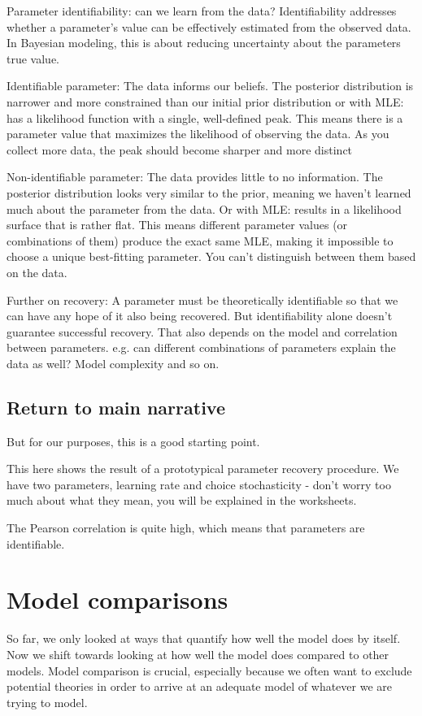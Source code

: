 \documentclass[12pt]{article}
\begin{document}
Parameter identifiability: can we learn from the data?
Identifiability addresses whether a parameter's value can be effectively estimated from the observed data. In Bayesian modeling, this is about reducing uncertainty about the parameters true value.

Identifiable parameter: The data informs our beliefs. The posterior distribution is narrower and more constrained than our initial prior distribution or with MLE: has a likelihood function with a single, well-defined peak. This means there is a parameter value that maximizes the likelihood of observing the data. As you collect more data, the peak should become sharper and more distinct

Non-identifiable parameter: The data provides little to no information. The posterior distribution looks very similar to the prior, meaning we haven't learned much about the parameter from the data. Or with MLE: results in a likelihood surface that is rather flat. This means different parameter values (or combinations of them) produce the exact same MLE, making it impossible to choose a unique best-fitting parameter. You can't distinguish between them based on the data.

Further on recovery: A parameter must be theoretically identifiable so that we can have any hope of it also being recovered. But identifiability alone doesn't guarantee successful recovery. That also depends on the model and correlation between parameters. e.g. can different combinations of parameters explain the data as well? Model complexity and so on.

\subsection{Return to main narrative}

But for our purposes, this is a good starting point.

This here shows the result of a prototypical parameter recovery procedure. We have two parameters, learning rate and choice stochasticity - don't worry too much about what they mean, you will be explained in the worksheets.

The Pearson correlation is quite high, which means that parameters are identifiable.

\section{Model comparisons}

So far, we only looked at ways that quantify how well the model does by itself. Now we shift towards looking at how well the model does compared to other models. Model comparison is crucial, especially because we often want to exclude potential theories in order to arrive at an adequate model of whatever we are trying to model.
\end{document}
